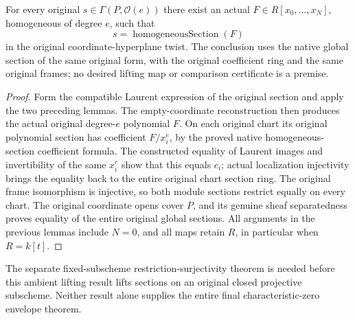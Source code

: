\begin{theorem}
\label{thm:c0n-ambient-section-homogeneous-lift}
\leanok
{}
For every original $s\in\Gamma(P,\mathcal O(e))$ there exist an actual
$F\in R[x_0,\ldots,x_N]$, homogeneous of degree $e$, such that
\[
 s=\operatorname{homogeneousSection}(F)
\]
in the original coordinate-hyperplane twist. The conclusion uses the
native global section of the same original form, with the original
coefficient ring and the same original frames; no desired lifting map
or comparison certificate is a premise.
\end{theorem}
\begin{proof}
Form the compatible Laurent expression of the original section and
apply the two preceding lemmas. The empty-coordinate reconstruction
then produces the actual original degree-$e$ polynomial $F$.
On each original chart its original polynomial section has coefficient
$F/x_i^e$, by the proved native homogeneous-section coefficient formula.
The constructed equality of Laurent images and invertibility of the
same $x_i^e$ show that this equals $c_i$; actual localization
injectivity brings the equality back to the entire original chart
section ring. The original frame isomorphism is injective, so both
module sections restrict equally on every chart. The original
coordinate opens cover $P$, and its genuine sheaf separatedness proves
equality of the entire original global sections. All arguments in the
previous lemmas include $N=0$, and all maps retain $R$, in particular
when $R=k[t]$.
\end{proof}

The separate fixed-subscheme restriction-surjectivity theorem is needed
before this ambient lifting result lifts sections on an original closed
projective subscheme. Neither result alone supplies the entire final
characteristic-zero envelope theorem.
